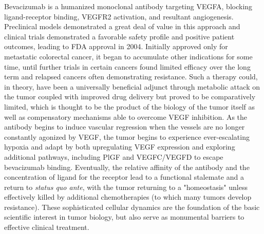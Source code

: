 Bevacizumab is a humanized monoclonal antibody targeting VEGFA, blocking ligand-receptor binding, VEGFR2 activation, and resultant angiogenesis. Preclinical models demonstrated a great deal of value in this approach and clinical trials demonstrated a favorable safety profile and positive patient outcomes, leading to FDA approval in 2004. Initially approved only for metastatic colorectal cancer, it began to accumulate other indications for some time, until further trials in certain cancers found limited efficacy over the long term and relapsed cancers often demonstrating resistance. Such a therapy could, in theory, have been a universally beneficial adjunct through metabolic attack on the tumor coupled with improved drug delivery but proved to be comparatively limited, which is thought to be the product of the biology of the tumor itself as well as compensatory mechanisms able to overcome VEGF inhibition. As the antibody begins to induce vascular regression when the vessels are no longer constantly agonized by VEGF, the tumor begins to experience ever-escalating hypoxia and adapt by both upregulating VEGF expression and exploring additional pathways, including PlGF and VEGFC/VEGFD to escape bevacizumab binding. Eventually, the relative affinity of the antibody and the concentration of ligand for the receptor lead to a functional stalemate and a return to \textit{status quo ante}, with the tumor returning to a "homeostasis" unless effectively killed by additional chemotherapies (to which many tumors develop resistance). These sophisticated cellular dynamics are the foundation of the basic scientific interest in tumor biology, but also serve as monumental barriers to effective clinical treatment. 

